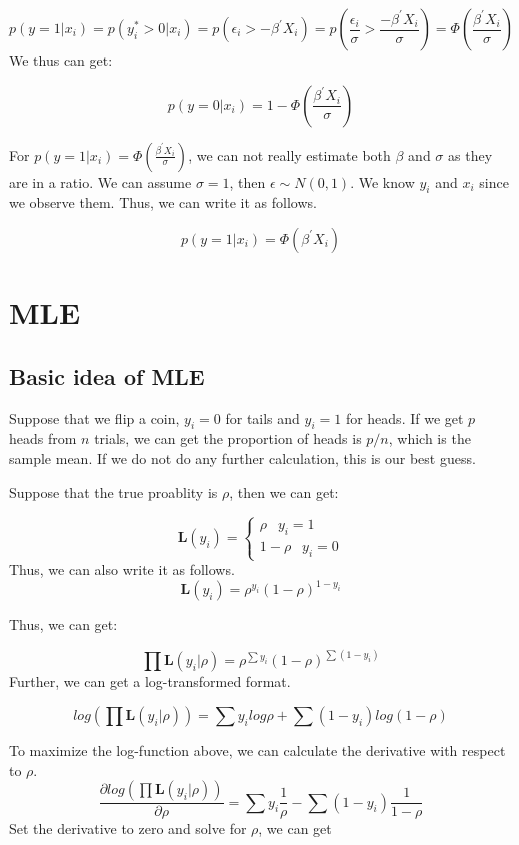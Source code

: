 \documentclass[]{book}
\begin{document}
\[p(y=1|x_i)= p(y_i^* >0|x_i)=p(\epsilon_i > -\beta^{'}X_i)= p(\frac{ \epsilon_i}{\sigma}>\frac{-\beta^{'}X_i}{\sigma})=\Phi(\frac{\beta^{'}X_i}{\sigma}) \]
We thus can get:

\[p(y=0|x_i)=1-\Phi(\frac{\beta^{'}X_i}{\sigma})\]

For \(p(y=1|x_i)=\Phi(\frac{\beta^{'}X_i}{\sigma})\), we can not really estimate both \(\beta\) and \(\sigma\) as they are in a ratio. We can assume \(\sigma =1\), then \(\epsilon \sim N(0,1)\).
We know \(y_i\) and \(x_i\) since we observe them. Thus, we can write it as follows.

\[p(y=1|x_i)=\Phi(\beta^{'}X_i)\]

\hypertarget{intro}{%
\chapter{MLE}\label{intro}}

\hypertarget{basic-idea-of-mle}{%
\section{Basic idea of MLE}\label{basic-idea-of-mle}}

Suppose that we flip a coin, \(y_i=0\) for tails and \(y_i=1\) for heads. If we get \(p\) heads from \(n\) trials, we can get the proportion of heads is \(p/n\), which is the sample mean. If we do not do any further calculation, this is our best guess.

Suppose that the true proablity is \(\rho\), then we can get:

\[
\mathbf{L}(y_i)=\begin{cases} \rho \;\;\:   y_i = 1 \\ 1-\rho \;\;\:  y_i = 0 \end{cases}
\]
Thus, we can also write it as follows.
\[\mathbf{L}(y_i) = \rho^{y_i}(1-\rho)^{1-y_i}\]

Thus, we can get:

\[\prod \mathbf{L}(y_i|\rho)=\rho^{\sum y_i}(1-\rho)^{\sum(1-y_i)}\]
Further, we can get a log-transformed format.

\[log (\prod \mathbf{L}(y_i|\rho))=\sum y_i log \rho + \sum(1-y_i) log(1-\rho)\]

To maximize the log-function above, we can calculate the derivative with respect to \(\rho\).
\[\frac{\partial log (\prod \mathbf{L}(y_i|\rho)) }{\partial \rho}=\sum y_i \frac{1}{\rho}-\sum(1-y_i) \frac{1}{1-\rho}\]
Set the derivative to zero and solve for \(\rho\), we can get
\end{document}
